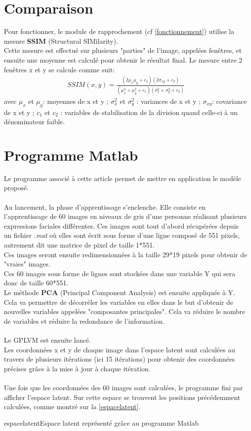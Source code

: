 \documentclass[overfullbox, poster]{polytech/polytech}
\begin{document}
\section{Comparaison}
Pour fonctionner, le module de rapprochement (cf \autoref{fonctionnement}) utilise la mesure \textbf{SSIM} (Structural SIMilarity).\\
Cette mesure est effectué sur plusieurs "parties" de l'image, appelées fenêtres, et ensuite une moyenne est calculé pour obtenir le résultat final. Le mesure entre 2 fenêtres x et y se calcule comme suit:
\begin{align*}
SSIM(x,y)=\frac{(2\mu _x\mu _y+c_1)(2\sigma _{xy}+c_2)}{(\mu ^2_x+\mu ^2_y+c_1)(\sigma ^2_x+\sigma ^2_y+c_2)}
\end{align*}
avec $\mu _x$ et $\mu _y$: moyennes de x et y ; $\sigma ^2_x$ et $\sigma ^2_y$ : variances de x et y ; $\sigma _{xy}$: covariance de x et y ; $c_1$ et $c_2$ : variables de stabilisation de la division quand celle-ci à un dénominateur faible.

\section{Programme Matlab}
Le programme associé à cette article permet de mettre en application le modèle proposé.\\
\\
Au lancement, la phase d'apprentissage s'enclenche. Elle consiste en l'apprentissage de 60 images en niveaux de gris d'une personne réalisant plusieurs expressions faciales différentes. Ces images sont tout d'abord récupérées depuis un fichier \textit{.mat} où elles sont écrit sous forme d'une ligne composé de 551 pixels, autrement dit une matrice de pixel de taille 1*551.\\
Ces images seront ensuite redimensionnées à la taille 29*19 pixels pour obtenir de "vraies" images.\\
Ces 60 images sous forme de lignes sont stockées dans une variable Y qui sera donc de taille 60*551.\\
Le méthode \textbf{PCA} (Principal Component Analysis) est ensuite appliquée à Y. Cela va permettre de décorréler les variables en elles dans le but d'obtenir de nouvelles variables appelées "composantes principales". Cela va réduire le nombre de variables et réduire la redondance de l'information.\\
\\
Le GPLVM est ensuite lancé.\\
Les coordonnées x et y de chaque image dans l'espace latent sont calculées au travers de plusieurs itérations (ici 15 itérations) pour obtenir des coordonnées précises grâce à la mise à jour à chaque itération.\\
\\
Une fois que les coordonnées des 60 images sont calculées, le programme fini par afficher l'espace latent. Sur cette espace se trouvent les positions précédemment calculées, comme montré sur la \autoref{espacelatent}.
\begin{Figure}{espacelatent}{Espace latent représenté grâce au programme Matlab}
\end{Figure}
\end{document}
